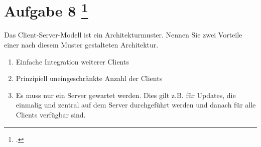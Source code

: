 \documentclass{lehramt-informatik-aufgabe}
\begin{document}
\section{Aufgabe 8
\footcite{66116:2021:03}}

Das Client-Server-Modell ist ein Architekturmuster. Nennen Sie zwei
Vorteile einer nach diesem Muster gestalteten Architektur.

\begin{liAntwort}
\begin{enumerate}
\item Einfache Integration weiterer Clients

\item Prinzipiell uneingeschränkte Anzahl der Clients

\item Es muss  nur ein Server gewartet werden. Dies gilt z.B. für
Updates, die einmalig und zentral auf dem Server durchgeführt werden und
danach für alle Clients verfügbar sind.
\end{enumerate}
\end{liAntwort}
\end{document}

